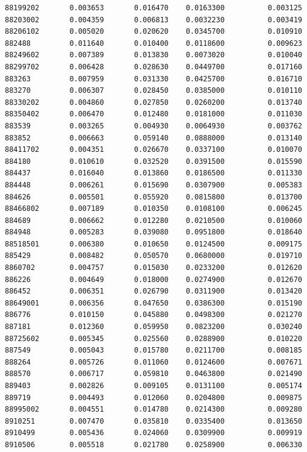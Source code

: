 \documentclass[
  letterpaper,
  DIV=11,
  numbers=noendperiod]{scrartcl}
\begin{document}
\begin{verbatim}
88199202       0.003653       0.016470    0.0163300          0.003125
88203002       0.004359       0.006813    0.0032230          0.003419
88206102       0.005020       0.020620    0.0345700          0.010910
882488         0.011640       0.010400    0.0118600          0.009623
88249602       0.007389       0.013830    0.0073020          0.010040
88299702       0.006428       0.028630    0.0449700          0.017160
883263         0.007959       0.031330    0.0425700          0.016710
883270         0.006307       0.028450    0.0385000          0.010110
88330202       0.004860       0.027850    0.0260200          0.013740
88350402       0.006470       0.012480    0.0181000          0.011030
883539         0.003265       0.004930    0.0064930          0.003762
883852         0.006663       0.059140    0.0888000          0.013140
88411702       0.004351       0.026670    0.0337100          0.010070
884180         0.010610       0.032520    0.0391500          0.015590
884437         0.016040       0.013860    0.0186500          0.011330
884448         0.006261       0.015690    0.0307900          0.005383
884626         0.005501       0.055920    0.0815800          0.013700
88466802       0.007189       0.010350    0.0108100          0.006245
884689         0.006662       0.012280    0.0210500          0.010060
884948         0.005283       0.039080    0.0951800          0.018640
88518501       0.006380       0.010650    0.0124500          0.009175
885429         0.008482       0.050570    0.0680000          0.019710
8860702        0.004757       0.015030    0.0233200          0.012620
886226         0.004649       0.018000    0.0274900          0.012670
886452         0.006351       0.026790    0.0311900          0.013420
88649001       0.006356       0.047650    0.0386300          0.015190
886776         0.010150       0.045880    0.0498300          0.021270
887181         0.012360       0.059950    0.0823200          0.030240
88725602       0.005345       0.025560    0.0288900          0.010220
887549         0.005043       0.015780    0.0211700          0.008185
888264         0.005726       0.011060    0.0124600          0.007671
888570         0.006717       0.059810    0.0463800          0.021490
889403         0.002826       0.009105    0.0131100          0.005174
889719         0.004493       0.012060    0.0204800          0.009875
88995002       0.004551       0.014780    0.0214300          0.009280
8910251        0.007470       0.035810    0.0335400          0.013650
8910499        0.005436       0.024060    0.0309900          0.009919
8910506        0.005518       0.021780    0.0258900          0.006330

\end{verbatim}
\end{document}
